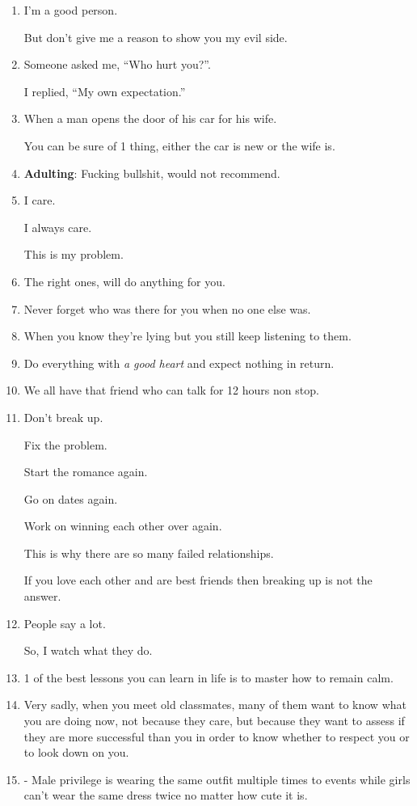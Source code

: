 \documentclass{article}
\numberwithin{equation}{section}
\begin{document}
\begin{enumerate}
    I can listen, ignore and forget at the same time.
    \item I'm a good person.
    
    But don't give me a reason to show you my evil side.
    \item Someone asked me, ``Who hurt you?''.
    
    I replied, ``My own expectation.''
    \item When a man opens the door of his car for his wife.
    
    You can be sure of 1 thing, either the car is new or the wife is.
    \item \textbf{Adulting}: Fucking bullshit, would not recommend.
    \item I care.
    
    I always care.
    
    This is my problem.
    \item The right ones, will do anything for you.
    \item Never forget who was there for you when no one else was.
    \item When you know they're lying but you still keep listening to them.
    \item Do everything with \textit{a good heart} and expect nothing in return.
    \item We all have that friend who can talk for 12 hours non stop.
    \item Don't break up.
    
    Fix the problem.
    
    Start the romance again.
    
    Go on dates again.
    
    Work on winning each other over again.
    
    This is why there are so many failed relationships.
    
    If you love each other and are best friends then breaking up is not the answer.
    \item People say a lot.
    
    So, I watch what they do.
    \item 1 of the best lessons you can learn in life is to master how to remain calm.
    \item Very sadly, when you meet old classmates, many of them want to know what you are doing now, not because they care, but because they want to assess if they are more successful than you in order to know whether to respect you or to look down on you.
    \item - Male privilege is wearing the same outfit multiple times to events while girls can't wear the same dress twice no matter how cute it is.
    

\end{enumerate}
\end{document}
